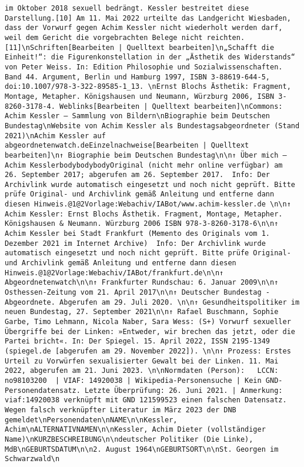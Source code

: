 \documentclass[
]{article}
\begin{document}
\begin{verbatim}
im Oktober 2018 sexuell bedrängt. Kessler bestreitet diese Darstellung.[10] Am 11. Mai 2022 urteilte das Landgericht Wiesbaden, dass der Vorwurf gegen Achim Kessler nicht wiederholt werden darf, weil dem Gericht die vorgebrachten Belege nicht reichten.[11]\nSchriften[Bearbeiten | Quelltext bearbeiten]\n„Schafft die Einheit!“: die Figurenkonstellation in der „Ästhetik des Widerstands“ von Peter Weiss. In: Edition Philosophie und Sozialwissenschaften. Band 44. Argument, Berlin und Hamburg 1997, ISBN 3-88619-644-5, doi:10.1007/978-3-322-89585-1_13. \nErnst Blochs Ästhetik: Fragment, Montage, Metapher. Königshausen und Neumann, Würzburg 2006, ISBN 3-8260-3178-4. Weblinks[Bearbeiten | Quelltext bearbeiten]\nCommons: Achim Kessler – Sammlung von Bildern\nBiographie beim Deutschen Bundestag\nWebsite von Achim Kessler als Bundestagsabgeordneter (Stand 2021)\nAchim Kessler auf abgeordnetenwatch.deEinzelnachweise[Bearbeiten | Quelltext bearbeiten]\n↑ Biographie beim Deutschen Bundestag\n\n↑ Über mich – Achim KesslerbodybodybodyOriginal (nicht mehr online verfügbar) am 26. September 2017; abgerufen am 26. September 2017.  Info: Der Archivlink wurde automatisch eingesetzt und noch nicht geprüft. Bitte prüfe Original- und Archivlink gemäß Anleitung und entferne dann diesen Hinweis.@1@2Vorlage:Webachiv/IABot/www.achim-kessler.de \n\n↑ Achim Kessler: Ernst Blochs Ästhetik. Fragment, Montage, Metapher. Königshausen & Neumann. Würzburg 2006 ISBN 978-3-8260-3178-6\n\n↑ Achim Kessler bei Stadt Frankfurt (Memento des Originals vom 1. Dezember 2021 im Internet Archive)  Info: Der Archivlink wurde automatisch eingesetzt und noch nicht geprüft. Bitte prüfe Original- und Archivlink gemäß Anleitung und entferne dann diesen Hinweis.@1@2Vorlage:Webachiv/IABot/frankfurt.de\n\n↑ Abgeordnetenwatch\n\n↑ Frankfurter Rundschau: 6. Januar 2009\n\n↑ Osthessen-Zeitung vom 21. April 2017\n\n↑ Deutscher Bundestag - Abgeordnete. Abgerufen am 29. Juli 2020. \n\n↑ Gesundheitspolitiker im neuen Bundestag, 27. September 2021\n\n↑ Rafael Buschmann, Sophie Garbe, Timo Lehmann, Nicola Naber, Sara Wess: (S+) Vorwurf sexueller Übergriffe bei der Linken: »Entweder, wir brechen das jetzt, oder die Partei bricht«. In: Der Spiegel. 15. April 2022, ISSN 2195-1349 (spiegel.de [abgerufen am 29. November 2022]). \n\n↑ Prozess: Erstes Urteil zu Vorwürfen sexualisierter Gewalt bei der Linken. 11. Mai 2022, abgerufen am 21. Juni 2023. \n\nNormdaten (Person):   LCCN: no98103200  | VIAF: 14920038 | Wikipedia-Personensuche | Kein GND-Personendatensatz. Letzte Überprüfung: 26. Juni 2021. | Anmerkung: viaf:14920038 verknüpft mit GND 121599523 einen falschen Datensatz. Wegen falsch verknüpfter Literatur im März 2023 der DNB gemeldet\nPersonendaten\nNAME\n\nKessler, Achim\nALTERNATIVNAMEN\n\nKessler, Achim Dieter (vollständiger Name)\nKURZBESCHREIBUNG\n\ndeutscher Politiker (Die Linke), MdB\nGEBURTSDATUM\n\n2. August 1964\nGEBURTSORT\n\nSt. Georgen im Schwarzwald\n

\end{verbatim}
\end{document}
